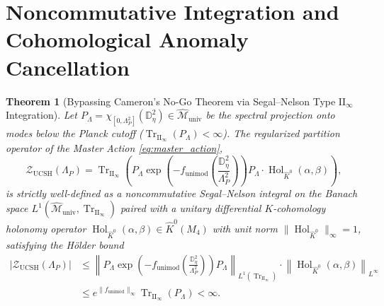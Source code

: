 \documentclass[11pt,a4paper]{article}
\theoremstyle{plain}
\newtheorem{theorem}{Theorem}[section]
\theoremstyle{definition}
\theoremstyle{remark}
\newcommand{\TrII}{\operatorname{Tr}_{\mathrm{II}_\infty}}
\newcommand{\Hol}{\operatorname{Hol}}
\newcommand{\M}{\mathcal{M}}
\newcommand{\Dbb}{\mathbb{D}}
\begin{document}
\section{Noncommutative Integration and Cohomological Anomaly Cancellation}
\label{sec:quantization}

\begin{theorem}[Bypassing Cameron's No-Go Theorem via Segal--Nelson Type $\mathrm{II}_\infty$ Integration]
\label{thm:cameron}
Let $P_\Lambda = \chi_{[0, \Lambda_P^2]}(\Dbb_\eta^2) \in \widehat{\M}_{\mathrm{univ}}$ be the spectral projection onto modes below the Planck cutoff ($\TrII(P_\Lambda) < \infty$). The regularized partition operator of the Master Action \eqref{eq:master_action},
\begin{equation}
  \mathcal{Z}_{\mathrm{UCSH}}(\Lambda_P) = \TrII\left( P_\Lambda \exp\left( - f_{\mathrm{unimod}}\left(\frac{\Dbb_\eta^2}{\Lambda_P^2}\right) \right) P_\Lambda \cdot \Hol_{\widehat{K}^0}(\alpha, \beta) \right),
\end{equation}
is strictly well-defined as a noncommutative Segal--Nelson integral on the Banach space $L^1(\widehat{\M}_{\mathrm{univ}}, \TrII)$ paired with a unitary differential $K$-cohomology holonomy operator $\Hol_{\widehat{K}^0}(\alpha,\beta) \allowbreak \in \widehat{K}^0(M_4)$ with unit norm $\|\Hol_{\widehat{K}^0}\|_\infty = 1$, satisfying the H\"older bound
\begin{align}
  \left| \mathcal{Z}_{\mathrm{UCSH}}(\Lambda_P) \right| &\le \left\| P_\Lambda \exp\left( - f_{\mathrm{unimod}}\left(\frac{\Dbb_\eta^2}{\Lambda_P^2}\right) \right) P_\Lambda \right\|_{L^1(\TrII)} \cdot \left\| \Hol_{\widehat{K}^0}(\alpha, \beta) \right\|_{L^\infty} \nonumber \\
  &\le e^{\|f_{\mathrm{unimod}}\|_\infty} \TrII(P_\Lambda) < \infty.
\end{align}
\end{theorem}
\end{document}

